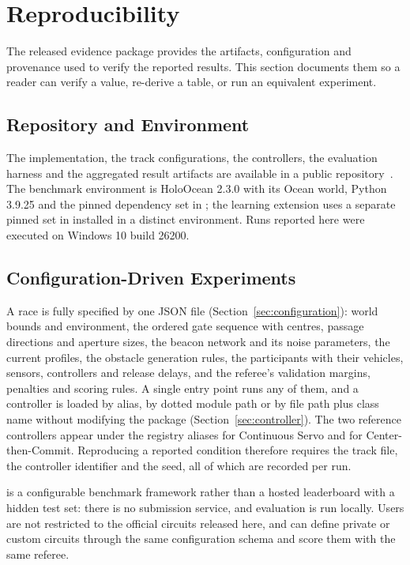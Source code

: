 \section{Reproducibility}
\label{sec:reproducibility}

The released evidence package provides the artifacts, configuration and
provenance used to verify the reported results. This section documents them so a
reader can verify a value, re-derive a table, or run an equivalent experiment.

\subsection{Repository and Environment}

The implementation, the track configurations, the controllers, the evaluation
harness and the aggregated result artifacts are available in a public
repository~\cite{holodronecompetition2026}. The benchmark environment is
HoloOcean 2.3.0 with its Ocean world, Python 3.9.25 and the pinned dependency set
in ; the learning extension uses a separate pinned set in
 installed in a distinct environment. Runs reported
here were executed on Windows 10 build 26200.

\subsection{Configuration-Driven Experiments}

A race is fully specified by one JSON file (Section~\ref{sec:configuration}):
world bounds and environment, the ordered gate sequence with centres, passage
directions and aperture sizes, the beacon network and its noise parameters, the
current profiles, the obstacle generation rules, the participants with their
vehicles, sensors, controllers and release delays, and the referee's validation
margins, penalties and scoring rules. A single entry point runs any of them, and
a controller is loaded by alias, by dotted module path or by file path plus class
name without modifying the package (Section~\ref{sec:controller}). The two
reference controllers appear under the registry aliases
 for Continuous Servo and
 for Center-then-Commit. Reproducing a
reported condition therefore requires the track file, the controller identifier
and the seed, all of which are recorded per run.

\mra{} is a configurable benchmark framework rather than a hosted leaderboard
with a hidden test set: there is no submission service, and evaluation is run
locally. Users are not restricted to the official circuits released here, and can
define private or custom circuits through the same configuration schema and score
them with the same referee.

